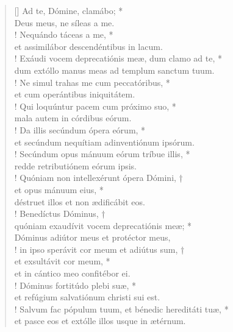 \begin{verse}[\versewidth]
Ad te, Dómine, clamábo; *\\
Deus meus, ne síleas a me.\\!
\vin Nequándo táceas a me, *\\
\vin et assimilábor descendéntibus in lacum.\\!
Exáudi vocem deprecatiónis meæ, dum clamo ad te, *\\
dum extóllo manus meas ad templum sanctum tuum.\\!
\vin Ne simul trahas me cum peccatóribus, *\\
\vin et cum operántibus iniquitátem.\\!
Qui loquúntur pacem cum próximo suo, *\\
mala autem in córdibus eórum.\\!
\vin Da illis secúndum ópera eórum, *\\
\vin et secúndum nequítiam adinventiónum ipsórum.\\!
Secúndum opus mánuum eórum tríbue illis, *\\
redde retributiónem eórum ipsis.\\!
\vin Quóniam non intellexérunt ópera Dómini, †\\
\vin et opus mánuum eius, *\\
\vin déstruet illos et non ædificábit eos.\\!
Benedíctus Dóminus, †\\
quóniam exaudívit vocem deprecatiónis meæ; *\\
Dóminus adiútor meus et protéctor meus,\\!
\vin in ipso sperávit cor meum et adiútus sum, †\\
\vin et exsultávit cor meum, *\\
\vin et in cántico meo confitébor ei.\\!
Dóminus fortitúdo plebi suæ, *\\
et refúgium salvatiónum christi sui est.\\!
\vin Salvum fac pópulum tuum, et bénedic hereditáti tuæ, *\\
\vin et pasce eos et extólle illos usque in ætérnum.\\
\end{verse}
\vspace{1cm}


